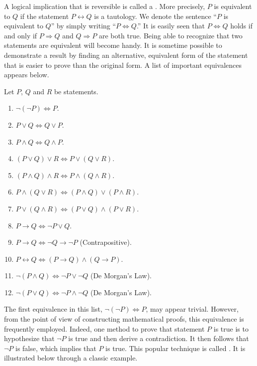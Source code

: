 A logical implication that is reversible is called a .
More precisely, $P$ is equivalent to $Q$ if the statement $P \leftrightarrow Q$ is a tautology.
We denote the sentence ``$P$ is equivalent to $Q$'' by simply writing ``$P \Leftrightarrow Q$.''
It is easily seen that $P \Leftrightarrow Q$ holds if and only if $P \Rightarrow Q$ and $Q \Rightarrow P$ are both true.
Being able to recognize that two statements are equivalent will become handy.
It is sometime possible to demonstrate a result by finding an alternative, equivalent form of the statement that is easier to prove than the original form.
A list of important equivalences appears below.

\begin{fact}
Let $P$, $Q$ and $R$ be statements.
\begin{enumerate}
\item $\neg (\neg P) \Leftrightarrow P$.
\item $P \vee Q \Leftrightarrow Q \vee P$.
\item $P \wedge Q \Leftrightarrow Q \wedge P$.
\item $(P \vee Q) \vee R \Leftrightarrow P \vee (Q \vee R)$.
\item $(P \wedge Q) \wedge R \Leftrightarrow P \wedge (Q \wedge R)$.
\item $P \wedge (Q \vee R) \Leftrightarrow (P \wedge Q) \vee (P \wedge R)$.
\item $P \vee (Q \wedge R) \Leftrightarrow (P \vee Q) \wedge (P \vee R)$.
\item $P \rightarrow Q \Leftrightarrow \neg P \vee Q$.
\item $P \rightarrow Q \Leftrightarrow \neg Q \rightarrow \neg P$ (Contrapositive).
\item $P \leftrightarrow Q \Leftrightarrow (P \rightarrow Q) \wedge (Q \rightarrow P)$.
\item $\neg (P \wedge Q) \Leftrightarrow \neg P \vee \neg Q$ (De Morgan's Law).
\item $\neg (P \vee Q) \Leftrightarrow \neg P \wedge \neg Q$ (De Morgan's Law).
\end{enumerate}
\end{fact}

The first equivalence in this list, $\neg (\neg P) \Leftrightarrow P$, may appear trivial.
However, from the point of view of constructing mathematical proofs, this equivalence is frequently employed.
Indeed, one method to prove that statement $P$ is true is to hypothesize that $\neg P$ is true and then derive a contradiction.
It then follows that $\neg P$ is false, which implies that $P$ is true.
This popular technique is called .
It is illustrated below through a classic example.

